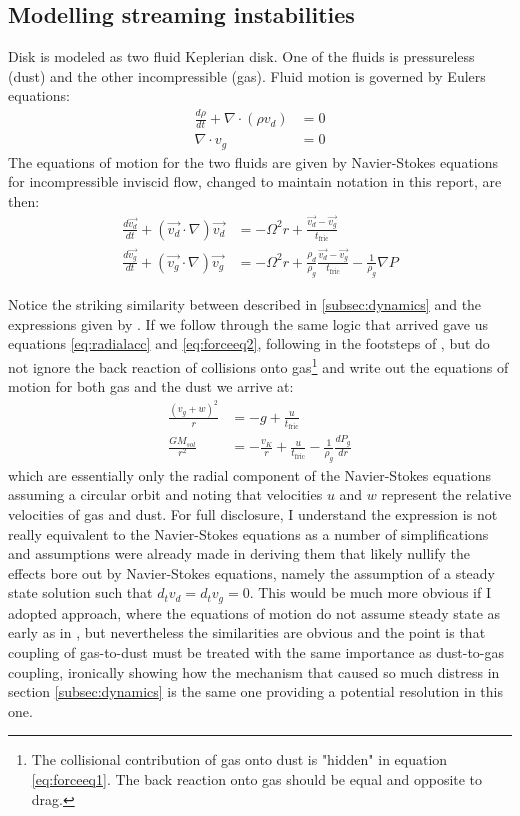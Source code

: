 \documentclass[12pt]{article}
\begin{document}
\subsection{Modelling streaming instabilities}

Disk is modeled as two fluid Keplerian disk. One of the fluids is pressureless (dust) and the other incompressible (gas). Fluid motion is governed by Eulers equations:
\begin{align}
    \label{eq:eulerseq}
    \frac{d\rho}{dt} + \nabla \cdot (\rho v_d) &= 0 \\
    \nabla \cdot v_g &= 0
\end{align}
The equations of motion for the two fluids are given by Navier-Stokes equations for incompressible inviscid flow, changed to maintain notation in this report, are then:
\begin{align}
    \label{eq:navierstokesgas}
    \frac{d \vec{v_d}}{dt} + (\vec{v_d}\cdot \nabla)\vec{v_d} &= -\Omega^2r + \frac{\vec{v_d}-\vec{v_g}}{t_\mathrm{fric}}\\
    \label{eq:navierstokesdust}
    \frac{d \vec{v_g}}{dt} + (\vec{v_g}\cdot \nabla)\vec{v_g} &= -\Omega^2r + \frac{\rho_d}{\rho_g}\frac{\vec{v_d}-\vec{v_g}}{t_\mathrm{fric}} - \frac{1}{\rho_g } \nabla P
\end{align}

Notice the striking similarity between described in \ref{subsec:dynamics} and the expressions given by \cite{Youdin05}. If we follow through the same logic that arrived gave us equations \ref{eq:radialacc} and \ref{eq:forceeq2}, following in the footsteps of \cite{Nakagawa86}, but do not ignore the back reaction of collisions onto gas\footnote{The collisional contribution of gas onto dust is "hidden" in equation \ref{eq:forceeq1}. The back reaction onto gas should be equal and opposite to drag.} and write out the equations of motion for both gas and the dust we arrive at:
\begin{align}
    \frac{(v_g + w)^2}{r} &= -g + \frac{u}{t_\mathrm{fric}} \\
    \frac{GM_{sol}}{r^2}  &= - \frac{v_K}{r} + \frac{u}{t_\mathrm{fric}} - \frac{1}{\rho_g}\frac{dP_g}{dr} 
\end{align}
which are essentially only the radial component of the Navier-Stokes equations assuming a circular orbit and noting that velocities $u$ and $w$ represent the relative velocities of gas and dust. For full disclosure, I understand the expression is not really equivalent to the Navier-Stokes equations as a number of simplifications and assumptions were already made in deriving them that likely nullify the effects bore out by Navier-Stokes equations, namely the assumption of a steady state solution such that $d_tv_d = d_tv_g = 0$. This would be much more obvious if I adopted \cite{Nakagawa86} approach, where the equations of motion do not assume steady state as early as in \cite{Weidenschilling77}, but nevertheless the similarities are obvious and the point is that coupling of gas-to-dust must be treated with the same importance as dust-to-gas coupling, ironically showing how the mechanism that caused so much distress in section \ref{subsec:dynamics} is the same one providing a potential resolution in this one.  
\end{document}
